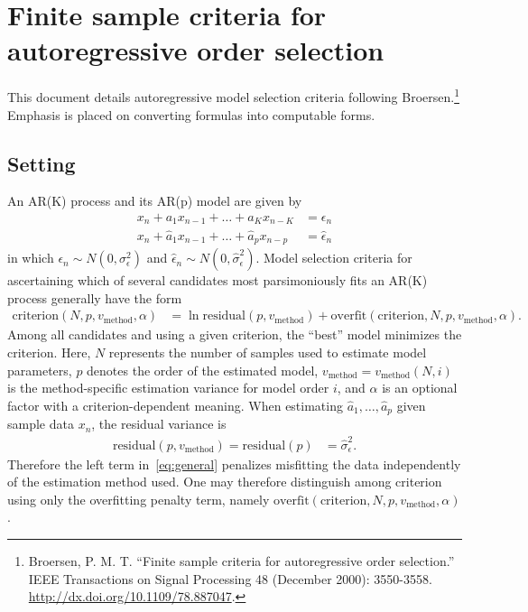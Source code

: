 \documentclass[12pt,letterpaper]{article}
\begin{document}
\section*{Finite sample criteria for autoregressive order selection}

This document details autoregressive model selection criteria following
Broersen.\footnote{ Broersen, P. M. T. ``Finite sample criteria
for autoregressive order selection.'' IEEE Transactions on Signal Processing 48
(December 2000): 3550-3558.  \url{http://dx.doi.org/10.1109/78.887047}.}
Emphasis is placed on converting formulas into computable forms.

\subsection*{Setting}

An AR(K) process and its AR(p) model are given by
\begin{subequations}
\begin{align}
    x_n+a_1x_{n-1}+\dots+a_Kx_{n-K}&=\epsilon_n
    \\
    {x}_n+\hat{a}_1x_{n-1}+\dots+\hat{a}_px_{n-p}&=\hat{\epsilon}_n
\end{align}
\end{subequations}
in which $\epsilon_n\sim N\left(0,\sigma_{\epsilon}^2\right)$ and
$\hat{\epsilon}_n\sim N\left(0,\hat{\sigma}_{\epsilon}^2\right)$.
Model selection criteria for ascertaining which of several candidates
most parsimoniously fits an AR(K) process generally have the form
\begin{align}
    \label{eq:general}
    \text{criterion}\!\left(N,p,v_\text{method},\alpha\right)
    &=
    \ln \text{residual}\!\left(p,v_\text{method}\right)
    +
    \text{overfit}\!\left(\text{criterion},N,p,v_\text{method},\alpha\right)
    .
\end{align}
Among all candidates and using a given criterion, the ``best'' model minimizes
the criterion.  Here, $N$ represents the number of samples used to estimate
model parameters, $p$ denotes the order of the estimated model,
$v_\text{method}=v_\text{method}\!\left(N,i\right)$ is the method-specific
estimation variance for model order $i$, and $\alpha$ is an optional factor
with a criterion-dependent meaning.  When estimating
$\hat{a}_1,\dots,\hat{a}_p$ given sample data $x_n$, the residual variance is
\begin{align}
    \text{residual}\!\left(p,v_\text{method}\right)
    =
    \text{residual}\!\left(p\right)
    &=
    \hat{\sigma}_\epsilon^2
    .
\end{align}
Therefore the left term in~\eqref{eq:general} penalizes misfitting the data
independently of the estimation method used.  One may therefore distinguish
among criterion using only the overfitting penalty term, namely
$\text{overfit}\!\left(\text{criterion},N,p,v_\text{method},\alpha\right)$.
\end{document}
